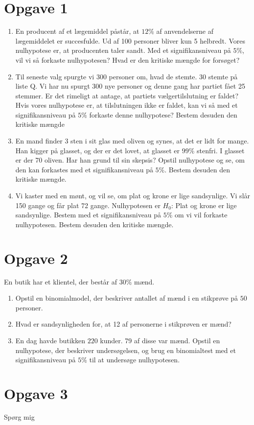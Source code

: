 \section*{Opgave 1}
\begin{enumerate}[label=\roman*)]
\item En producent af et lægemiddel påstår, at $12\%$ af anvendelserne af lægemiddelet er succesfulde. Ud af 100 personer bliver kun 5 helbredt. Vores nulhypotese er, at producenten taler sandt. Med et signifikansniveau på $5\%$, vil vi så forkaste nulhypotesen? Hvad er den kritiske mængde for forsøget?
\item Til seneste valg spurgte vi 300 personer om, hvad de stemte. 30 stemte på liste Q. Vi har nu spurgt 300 nye personer og denne gang har partiet fået 25 stemmer. Er det rimeligt at antage, at partiets vælgertilslutning er faldet? Hvis vores nulhypotese er, at tilslutningen ikke er faldet, kan vi så med et signifikansniveau på $5\%$ forkaste denne nulhypotese? Bestem desuden den kritiske mængde
\item En mand finder 3 sten i sit glas med oliven og synes, at det er lidt for mange. Han kigger på glasset, og der er det lovet, at glasset er $99\%$ stenfri. I glasset er der 70 oliven. Har han grund til sin skepsis? Opstil nulhypotese og se, om den kan forkastes med et signifikansniveau på $5\%$. Bestem desuden den kritiske mængde. 
\item Vi kaster med en mønt, og vil se, om plat og krone er lige sandsynlige. Vi slår 150 gange og får plat 72 gange. Nulhypotesen er $H_0$: Plat og krone er lige sandsynlige. Bestem med et signifikansniveau på $5\%$ om vi vil forkaste nulhypotesen. Bestem desuden den kritiske mængde. 
\end{enumerate}

\section*{Opgave 2}
En butik har et klientel, der består af $30\%$ mænd. 
\begin{enumerate}[label=\roman*)]
\item Opstil en binomialmodel, der beskriver antallet af mænd i en stikprøve på $50$ personer.
\item Hvad er sandsynligheden for, at 12 af personerne i stikprøven er mænd?
\item En dag havde butikken $220$ kunder. 79 af disse var mænd. Opstil en nulhypotese, der beskriver undersøgelsen, og brug en binomialtest med et signifikansniveau på $5\%$ til at undersøge nulhypotesen. 
\end{enumerate}

\section*{Opgave 3}
Spørg mig